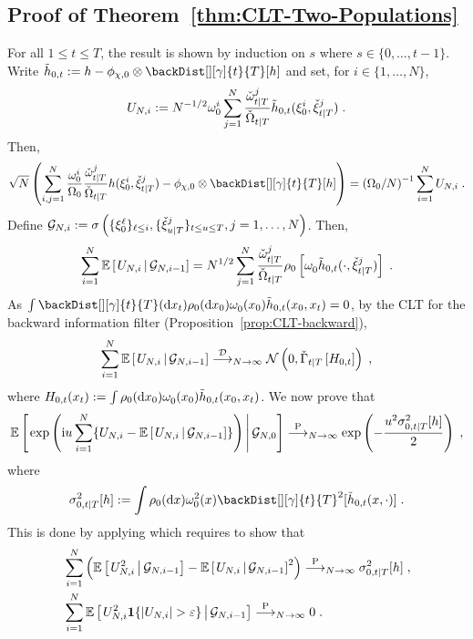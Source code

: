 \subsection{Proof of Theorem~\ref{thm:CLT-Two-Populations}}
\label{proof:thm:CLT-Two-Populations}
For all $1\le t\le T$, the result is shown by induction on $s$ where $s \in \{0, \dots, t-1\}$. Write $\tilde{h}_{0,t}\eqdef h - \filt{\Xinit,0}\otimes \backDist[][\gamma]{t}{T}[h]$ and set, for $i \in \{1,\dots,N\}$,
\begin{equation*}
U_{N,i} \eqdef N^{-1/2} \ewght{0}{i} \sum_{j=1}^N \frac{\ebackwght{t}{T}{j}}{\backsumwght{t}{T}} \tilde{h}_{0,t}(\epart{0}{i},\ebackpart{t}{T}{j})\eqsp.
\end{equation*}
Then,
\[
\sqrt{N}\left(\sum_{i,j=1}^N \frac{\swght{0}{i}}{\sumwght{0}}\frac{\ebackwght{t}{T}{j}}{\backsumwght{t}{T}} h(\epartpred{0}{i},\ebackpart{t}{T}{j}) - \filt{\Xinit,0}\otimes \backDist[][\gamma]{t}{T}[h]
\right) = \left(\sumwght{0}/N\right)^{-1}\sum_{i=1}^N U_{N,i}\eqsp.
\]
Define $\mathcal{G}_{N,i} :=  \sigma\left(\{\xi_{0}^{\ell}\}_{\ell \leq i}, \{{\check{\xi}}_{u|T}^{j}\}_{t \leq u \leq T}, j=1,\dots,N \right)$. Then,
\[
\sum_{i=1}^N \CPE{U_{N,i}}{\mcg{N,i-1}} = N^{1/2} \sum_{j=1}^N \frac{\ebackwght{t}{T}{j}}{\backsumwght{t}{T}} \XinitIS{0}\left[\ewght{0}{}\tilde{h}_{0,t}(\cdot, \ebackpart{t}{T}{j}) \right]\eqsp.
\]
As $\int \backDist[][\gamma]{t}{T}(\rmd x_t)\XinitIS{0}(\rmd x_0)\ewght{0}{}(x_0)\tilde{h}_{0,t}(x_0,x_t) = 0$, by the CLT for the backward information filter (Proposition~\ref{prop:CLT-backward}),
\begin{equation*}
\label{eq:CLT-1}
\sum_{i=1}^N \CPE{U_{N,i}}{\mcg{N,i-1}} \dlim_{N\to\infty} \mathcal{N}\left( 0, \backasymVar{t}{T}{H_{0,t}} \right) \eqsp,
\end{equation*}
where $H_{0,t}(x_t)\eqdef \int \XinitIS{0}(\rmd x_0)\ewght{0}{}(x_0)\tilde{h}_{0,t}(x_0,x_t)$.
We now prove that
\[
\CPE{\exp\left(\rmi u \sum_{i=1}^N \{U_{N,i}-\CPE{U_{N,i}}{\mcg{N,i-1}}\} \right)}{\mcg{N,0}}\plim_{N \to \infty} \exp\left(-\frac{u^2 \sigma^2_{0,t|T}[h]}{2}\right)\eqsp,
\]
where
\[
\sigma^2_{0,t|T}[h]\eqdef  \int \XinitIS{0}(\rmd x)\ewght{0}{2}(x)\backDist[][\gamma]{t}{T}^2[\tilde{h}_{0,t}(x,\cdot)]\eqsp.
\]
This is done by applying \cite[Theorem~A.3]{douc:moulines:2008} which requires to show that
\begin{align}
\label{eq:condRD-1}
 &\sum_{i=1}^N \left(\CPE{U_{N,i}^2}{\mcg{N,i-1}}-\CPE{U_{N,i}}{\mcg{N,i-1}}^2 \right)\plim_{N \to \infty} \sigma^2_{0,t|T}[h]\eqsp, \\
\label{eq:condRD-3}
 &\sum_{i=1}^N \CPE{U_{N,i}^2 \1\{|U_{N,i}|>\varepsilon\}}{\mcg{N,i-1}} \plim_{N \to \infty} 0\eqsp.
\end{align}
